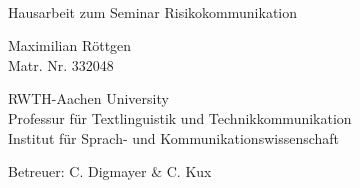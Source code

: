 \documentclass[fontsize=13pt,a4paper]{article}
\begin{document}
\thispagestyle{empty}

{%
 \sffamily
 \centering
 \Large

 ~\vspace{\fill}

 {\huge
  Hausarbeit zum Seminar Risikokommunikation}

 \vspace{2.5cm}

 {\large
  Maximilian Röttgen
 }\\
 Matr. Nr. 332048

 \vspace{3.5cm}

 RWTH-Aachen University\\
 Professur für Textlinguistik und Technikkommunikation\\
 Institut für Sprach- und Kommunikationswissenschaft

 \vspace{3.5cm}

 Betreuer: C. Digmayer & C. Kux

 \vspace{\fill}


}%
\clearpage
\sffamily

\tableofcontents
\end{document}
